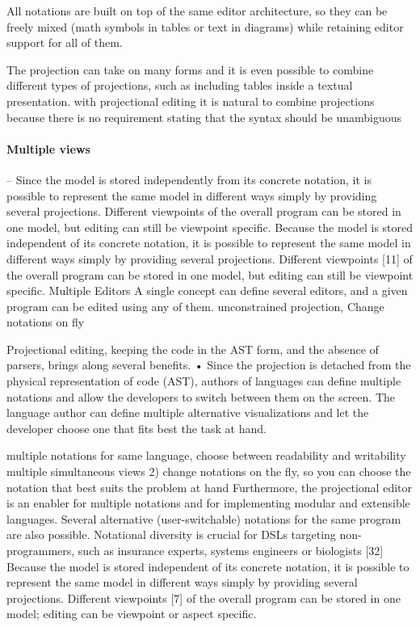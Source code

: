 All notations are built on top of the same editor architecture, so they can be freely mixed (math symbols in tables or text in diagrams) while retaining editor support for all of them.

The projection can take on many forms and it is even possible to combine different types of projections, such as including tables inside a textual presentation.
with projectional editing it is natural to combine projections because there is no requirement stating that the syntax should be unambiguous 

\paragraph{Multiple views}
– Since the model is stored independently from its concrete notation, it is possible to represent the same model in different ways simply by providing several projections.
Different viewpoints of the overall program can be stored in one model, but editing can still be viewpoint specific.
Because the model is stored independent of its concrete notation, it is possible to represent the same model in different ways simply by providing several projections.
Different viewpoints [11] of the overall program can be stored in one model, but editing can still be viewpoint specific.
Multiple Editors A single concept can define several editors, and a given program can be edited using any of them.
unconstrained projection, Change notations on fly

Projectional editing, keeping the code in the AST form, and the absence of parsers, brings along several benefits.
• Since the projection is detached from the physical representation of code (AST), authors of languages can define multiple notations and allow the developers to switch between them on the screen.
The language author can define multiple alternative visualizations and let the developer choose one that fits best the task at hand.

multiple notations for same language, choose between readability and writability
multiple simultaneous views
2) change notations on the fly, so you can choose the notation that best suits the problem at hand
Furthermore, the projectional editor is an enabler for multiple notations and for implementing modular and extensible languages.
Several alternative (user-switchable) notations for the same program are also possible.
Notational diversity is crucial for DSLs targeting non-programmers, such as insurance experts, systems engineers or biologists [32]
Because the model is stored independent of its concrete notation, it is possible to represent the same model in different ways simply by providing several projections.
Different viewpoints [7] of the overall program can be stored in one model; editing can be viewpoint or aspect specific.


